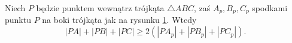 %

\begin{theorem}
    Niech $P$ będzie punktem wewnątrz trójkąta $\triangle ABC$, zaś $A_p, B_p, C_p$ spodkami punktu $P$ na boki trójkąta jak na rysunku \ref{erdos_mordell_barrowa}.
    Wtedy
    \begin{equation}
        |PA| + |PB| + |PC| \ge 2 (|PA_p| + |PB_p| + |PC_p|).
    \end{equation}
\end{theorem}

\begin{figure}[H] \centering
\begin{minipage}[b]{.45\linewidth}
\begin{center}
    \begin{comment}
    \begin{tikzpicture}[scale=.4]
    \tkzDefPoint(0, 0){A}
    \tkzDefPoint(10, 2){B}
    \tkzDefPoint(6, 7){C}
    \tkzDefPoint(5, 3){P}
    \tkzLabelPoint[below left](A){$A$}
    \tkzLabelPoint[below right](B){$B$}
    \tkzLabelPoint[above](C){$C$}
    \tkzLabelPoint[below left](P){$P$}
    \tkzDefPointsBy[projection=onto A--B](P){Pc}
    \tkzDefPointsBy[projection=onto B--C](P){Pa}
    \tkzDefPointsBy[projection=onto C--A](P){Pb}
    \tkzLabelPoint[above right](Pa){$A_p$}
    \tkzLabelPoint[above left](Pb){$B_p$}
    \tkzLabelPoint[below](Pc){$C_p$}

    \tkzDrawSegments[line width=0.2mm,dashed](P,Pa P,Pb P,Pc)
    \tkzDrawPolygon[line width=0.3mm](A,B,C)
    \tkzMarkRightAngles[size=0.5](P,Pa,C P,Pb,A P,Pc,B)
    \tkzDrawPoints[size=3,color=black,fill=black!50](A,B,C,P,Pc,Pb,Pa)
\end{tikzpicture}
\end{comment}
    \end{center}
    \label{erdos_mordell_barrowa}
\end{minipage}
%
\begin{minipage}[b]{.45\linewidth}
\begin{center}\begin{comment}
    \begin{tikzpicture}[scale=.4]
    \tkzDefPoint(0, 0){A}
    \tkzDefPoint(10, 2){B}
    \tkzDefPoint(6, 7){C}
    \tkzDefPoint(5, 3){P}

    \tkzDefLine[bisector](A,P,B) \tkzGetPoint{prePc}
    \tkzInterLL(P,prePc)(A,B) \tkzGetPoint{Pc}
    \tkzDefLine[bisector](B,P,C) \tkzGetPoint{prePa}
    \tkzInterLL(P,prePa)(B,C) \tkzGetPoint{Pa}
    \tkzDefLine[bisector](C,P,A) \tkzGetPoint{prePb}
    \tkzInterLL(P,prePb)(C,A) \tkzGetPoint{Pb}


\end{comment}
\end{center}
\end{minipage}
\end{figure}
